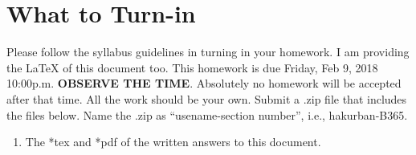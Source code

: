 \documentclass{article}
\newcommand{\quotes}[1]{``#1''}
\begin{document}

\section*{What to Turn-in }
Please follow the syllabus guidelines in turning in your homework.  I am providing the \LaTeX{} of this document too. This homework is due Friday, Feb  9, 2018 10:00p.m. \textbf{OBSERVE THE  TIME}. Absolutely no homework will be accepted after that time. 
All the work should be your own.   Submit a .zip file that includes the files below. Name the .zip as \quotes{usename-section number}, i.e., hakurban-B365.
\begin{enumerate}
\item The *tex and *pdf of the written answers to this document.
\end{enumerate}

\end{document}
